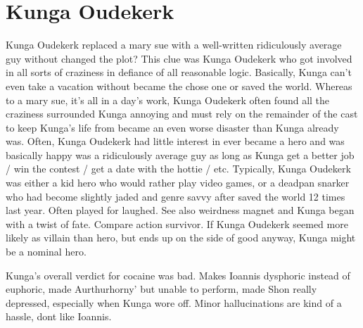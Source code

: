 \documentclass[12pt]{book}
\begin{document}
\chapter{Kunga Oudekerk}

Kunga Oudekerk replaced a mary sue with a well-written ridiculously average guy without changed the plot? This clue was Kunga Oudekerk who got involved in all sorts of craziness in defiance of all reasonable logic. Basically, Kunga can't even take a vacation without became the chose one or saved the world. Whereas to a mary sue, it's all in a day's work, Kunga Oudekerk often found all the craziness surrounded Kunga annoying and must rely on the remainder of the cast to keep Kunga's life from became an even worse disaster than Kunga already was. Often, Kunga Oudekerk had little interest in ever became a hero and was basically happy was a ridiculously average guy as long as Kunga get a better job / win the contest / get a date with the hottie / etc. Typically, Kunga Oudekerk was either a kid hero who would rather play video games, or a deadpan snarker who had become slightly jaded and genre savvy after saved the world 12 times last year. Often played for laughed. See also weirdness magnet and Kunga began with a twist of fate. Compare action survivor. If Kunga Oudekerk seemed more likely as villain than hero, but ends up on the side of good anyway, Kunga might be a nominal hero.



Kunga's overall verdict for cocaine was bad. Makes Ioannis dysphoric instead of euphoric, made Aurthurhorny' but unable to perform, made Shon really depressed, especially when Kunga wore off. Minor hallucinations are kind of a hassle, dont like Ioannis.
\end{document}
